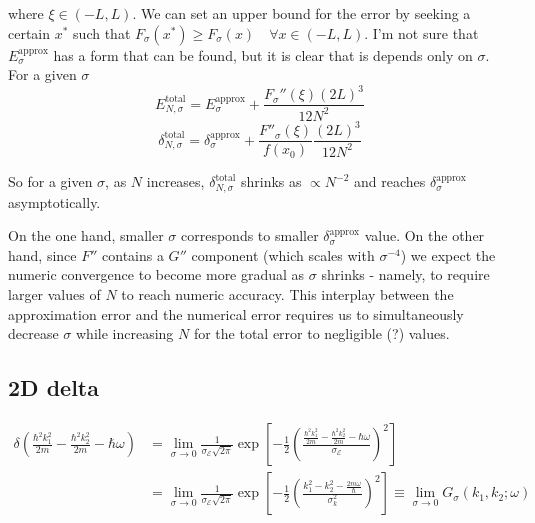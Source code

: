 where $\xi\in(-L,L)$. We can set an upper bound for the error by seeking a certain $x^{*}$ such that $F_{\sigma}(x^{*})\geq F_{\sigma}(x) \quad \forall x\in(-L,L)$. I'm not sure that $E_{\sigma}^{\text{approx}}$ has a form that can be found, but it is clear that is depends only on $\sigma$. For a given $\sigma$
\begin{equation}
E^{\text{total}}_{N,\sigma} = E_{\sigma}^{\text{approx}} + \frac{F_{\sigma}''(\xi)(2L)^{3}}{12N^{2}}
\label{eq:delta_total_error_bound}
\end{equation}
\begin{equation}
\delta_{N,\sigma}^{\text{total}}=\delta^{\text{approx}}_{\sigma} + \frac{F''_{\sigma}(\xi)}{f(x_{0})} \frac{(2L)^{3}}{12N^{2}}
\label{eq:delta_relative_error_bound}
\end{equation}

So for a given $\sigma$, as $N$ increases, $\delta_{N,\sigma}^{\text{total}}$ shrinks as $\propto N^{-2}$ and reaches $\delta^{\text{approx}}_{\sigma}$ asymptotically.

On the one hand, smaller $\sigma$ corresponds to smaller $\delta^{\text{approx}}_{\sigma}$ value. On the other hand, since $F''$ contains a $G''$ component (which scales with $\sigma^{-4}$) we expect the numeric convergence to become more gradual as $\sigma$ shrinks - namely, to require larger values of $N$ to reach numeric accuracy. This interplay between the approximation error and the numerical error requires us to simultaneously decrease $\sigma$ while increasing $N$ for the total error to negligible (?) values.

\subsection{2D delta}

\begin{align}
\delta\left( \frac{\hbar^{2} k_{1}^{2}}{2m}-\frac{\hbar^{2} k_{2}^{2}}{2m} -\hbar\omega\right) &= \lim\limits_{\sigma\to 0} \frac{1}{\sigma_{\mathcal{E}}\sqrt{ 2\pi }} \exp\left[-\frac{1}{2} \left(\frac{\frac{\hbar^{2} k_{1}^{2}}{2m}-\frac{\hbar^{2} k_{2}^{2}}{2m} -\hbar\omega}{\sigma_{\mathcal{E}}} \right)^{2} \right] \\
&= \lim\limits_{\sigma\to 0} \frac{1}{\sigma_{\mathcal{E}}\sqrt{ 2\pi }} \exp\left[-\frac{1}{2} \left(\frac{k_{1}^{2}- k_{2}^{2} -\frac{2m\omega}{\hbar}}{\sigma_{k}^{2}} \right)^{2} \right] \equiv \lim\limits_{\sigma\to 0} G_{\sigma}(k_{1}, k_{2};\omega)
\label{eq:delta_2d_gaussian}
\end{align}

